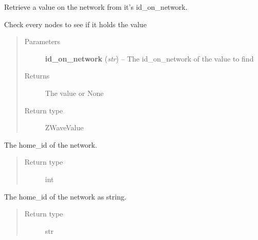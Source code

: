 \documentclass[letterpaper,10pt,english]{sphinxmanual}
\begin{document}
\begin{fulllineitems}
\begin{fulllineitems}
\label{network:openzwave.network.ZWaveNetwork.get_value_from_id_on_network}
Retrieve a value on the network from it's id\_on\_network.

Check every nodes to see if it holds the value
\begin{quote}\begin{description}
\item[{Parameters}] \leavevmode
\textbf{id\_on\_network} (\emph{str}) -- The id\_on\_network of the value to find

\item[{Returns}] \leavevmode
The value or None

\item[{Return type}] \leavevmode
ZWaveValue

\end{description}\end{quote}

\end{fulllineitems}


\begin{fulllineitems}
\label{network:openzwave.network.ZWaveNetwork.home_id}
The home\_id of the network.
\begin{quote}\begin{description}
\item[{Return type}] \leavevmode
int

\end{description}\end{quote}

\end{fulllineitems}


\begin{fulllineitems}
\label{network:openzwave.network.ZWaveNetwork.home_id_str}
The home\_id of the network as string.
\begin{quote}\begin{description}
\item[{Return type}] \leavevmode
str

\end{description}\end{quote}


\end{fulllineitems}
\end{fulllineitems}
\end{document}
